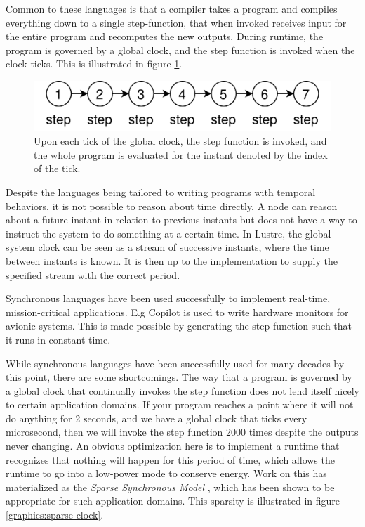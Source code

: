 Common to these languages is that a compiler takes a program and compiles everything down to a single step-function, that
when invoked receives input for the entire program and recomputes the new outputs. During runtime, the program is governed
by a global clock, and the step function is invoked when the clock ticks. This is illustrated in figure \ref{graphics:global-clock}.

\begin{figure}
    \centering
    \includegraphics[scale=0.2]{graphics/clock-governed.png}
    \caption{Upon each tick of the global clock, the step function is invoked, and the whole program
    is evaluated for the instant denoted by the index of the tick.}
    \label{graphics:global-clock}
\end{figure}

Despite the languages being tailored to writing programs with temporal behaviors, it is not possible to reason
about time directly. A node can reason about a future instant in relation to previous instants but does not have
a way to instruct the system to do something at a certain time. In Lustre, the global system clock can be seen
as a stream of successive instants, where the time between instants is known. It is then up to the implementation to supply
the specified stream with the correct period.

Synchronous languages have been used successfully to implement real-time, mission-critical applications. E.g
Copilot\cite{DBLP:conf/rv/PikeGMN10} is used to write hardware monitors for avionic systems. This is made possible by generating
the step function such that it runs in constant time.

While synchronous languages have been successfully used for many decades by this point, there are some shortcomings.
The way that a program is governed by a global clock that continually invokes the step function does not lend itself nicely to
certain application domains. If your program reaches a point where it will not do anything for 2 seconds, and we have a global
clock that ticks every microsecond, then we will invoke the step function 2000 times despite the outputs never changing.
An obvious optimization here is to implement a runtime that recognizes that nothing will happen for this period of time,
which allows the runtime to go into a low-power mode to conserve energy. Work on this has materialized as the
\textit{Sparse Synchronous Model} \cite{DBLP:conf/fdl/EdwardsH20}, which has been shown to be appropriate for such
application domains. This sparsity is illustrated in figure \ref{graphics:sparse-clock}.

